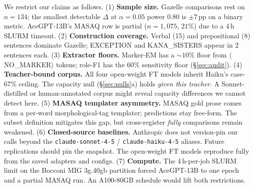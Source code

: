 \documentclass[10pt,a4paper,twocolumn]{article}
\begin{document}
We restrict our claims as follows. (1) \textbf{Sample size.} Gazelle comparisons rest on $n{=}134$; the smallest detectable $\Delta$ at $\alpha{=}0.05$ power $0.80$ is $\pm 7$\,pp on a binary metric. AceGPT-13B's MASAQ row is partial ($n{=}1{,}075$, $21\%$) due to a 4\,h SLURM timeout. (2) \textbf{Construction coverage.} Verbal (15) and prepositional (8) sentences dominate Gazelle; EXCEPTION and KANA\_SISTERS appear in 2 sentences each. (3) \textbf{Extractor floors.} Marker-EM has a $\sim 10\%$ floor from $\langle$NO\_MARKER$\rangle$ tokens; role-F1 has the $60\%$ sensitivity floor (\S\ref{sec:audit}). (4) \textbf{Teacher-bound corpus.} All four open-weight FT models inherit Haiku's case-67\% ceiling. The capacity null (\S\ref{sec:nulls}a) holds \emph{given this teacher}. A Sonnet-distilled or human-annotated corpus might reveal capacity differences we cannot detect here. (5) \textbf{MASAQ templater asymmetry.} MASAQ gold prose comes from a per-word morphological-tag templater; predictions stay free-form. The subset definition mitigates this gap, but cross-register \emph{fully} comparisons remain weakened. (6) \textbf{Closed-source baselines.} Anthropic does not version-pin our calls beyond the \texttt{claude-sonnet-4-5} / \texttt{claude-haiku-4-5} aliases. Future replications should pin the snapshot. The open-weight FT models reproduce fully from the saved adapters and configs. (7) \textbf{Compute.} The 4\,h-per-job SLURM limit on the Bocconi MIG 3g.40gb partition forced AceGPT-13B to one epoch and a partial MASAQ run. An A100-80GB schedule would lift both restrictions.
\end{document}
